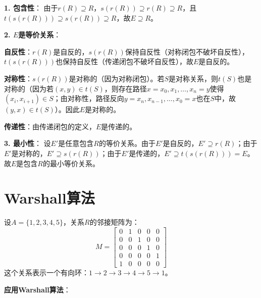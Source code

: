 \textbf{1. 包含性}：
由于$r(R) \supseteq R$，$s(r(R)) \supseteq r(R) \supseteq R$，且$t(s(r(R))) \supseteq s(r(R)) \supseteq R$，故$E \supseteq R$。

\textbf{2. $E$是等价关系}：

\textbf{自反性}：$r(R)$是自反的，$s(r(R))$保持自反性（对称闭包不破坏自反性），$t(s(r(R)))$也保持自反性（传递闭包不破坏自反性），故$E$是自反的。

\textbf{对称性}：$s(r(R))$是对称的（因为对称闭包）。若$S$是对称关系，则$t(S)$也是对称的（因为若$(x,y) \in t(S)$，则存在路径$x=x_0,x_1,\ldots,x_n=y$使得$(x_i,x_{i+1}) \in S$；由对称性，路径反向$y=x_n,x_{n-1},\ldots,x_0=x$也在$S$中，故$(y,x) \in t(S)$）。因此$E$是对称的。

\textbf{传递性}：由传递闭包的定义，$E$是传递的。

\textbf{3. 最小性}：
设$E'$是任意包含$R$的等价关系。由于$E'$是自反的，$E' \supseteq r(R)$；由于$E'$是对称的，$E' \supseteq s(r(R))$；由于$E'$是传递的，$E' \supseteq t(s(r(R))) = E$。故$E$是包含$R$的最小等价关系。
\section{Warshall算法}
设$A = \{1,2,3,4,5\}$，关系$R$的邻接矩阵为：
\[
M = \begin{bmatrix}
0 & 1 & 0 & 0 & 0 \\
0 & 0 & 1 & 0 & 0 \\
0 & 0 & 0 & 1 & 0 \\
0 & 0 & 0 & 0 & 1 \\
1 & 0 & 0 & 0 & 0
\end{bmatrix}
\]
这个关系表示一个有向环：$1 \to 2 \to 3 \to 4 \to 5 \to 1$。

\textbf{应用Warshall算法}：


